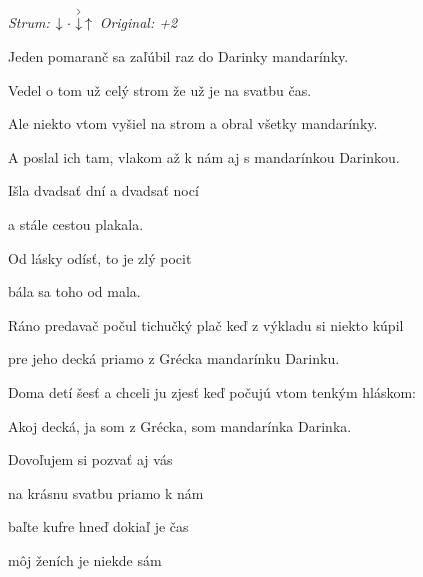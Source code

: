 \begin{song}


 \quad
\textit{Strum:} $\Down\Miss\AccentDown\Up$  \quad
\textit{Original: +2}

\large


\Large

\bigskip

Jeden pomaranč sa zaľúbil raz do Darinky mandarínky.\par
{}Vedel o tom už celý strom že už je na svatbu čas.\par
{}Ale niekto vtom vyšiel na strom a obral všetky mandarínky.\par
A poslal ich tam, vlakom až k nám aj s mandarínkou Darinkou.\par

\bigskip

Išla dvadsať dní a dvadsať nocí\par
a stále cestou plakala.\par
{}Od lásky odísť, to je zlý pocit\par
{}bála sa toho od mala. \par

\bigskip

Ráno predavač počul tichučký plač keď z výkladu si niekto kúpil\par
pre jeho decká priamo z Grécka mandarínku Darinku.\par
{}Doma detí šesť a chceli ju zjesť keď počujú vtom tenkým hláskom:\par
{}Akoj decká, ja som z Grécka, som mandarínka Darinka.\par

\bigskip

Dovoľujem si pozvať aj vás\par
na krásnu svatbu priamo k nám\par
{}baľte kufre hneď dokiaľ je čas\par
{}môj ženích je niekde sám \par


\end{song}
